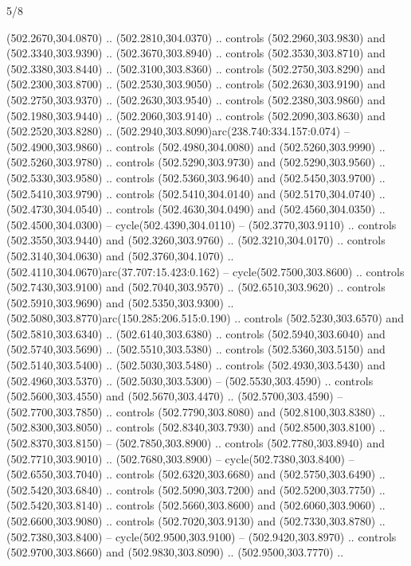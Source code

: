 \begin{flagdescription}{5/8}
\begin{scope}[xshift=0.5\flaglength,yshift=0.5\flagwidth,scale=\flagwidth/475.63]
\begin{scope}[y=0.8pt, x=0.8pt, yscale=-1, xscale=1,shift={(-450,-300)}]
\begin{scope}[cm={{1.0,0.0,0.0,1.0,(-0.0002,0.12556)}},cm={{1.0,0.0,0.0,1.0,(0.00179,0.0)}}]
\begin{scope}[cm={{1.11592,0.0,0.0,1.11592,(-106.89933,-41.77764)}}]
\begin{scope}[draw=black,fill=cfff]
\begin{scope}[fill=black]
  (502.2670,304.0870) .. (502.2810,304.0370) .. controls (502.2960,303.9830) and
  (502.3340,303.9390) .. (502.3670,303.8940) .. controls (502.3530,303.8710) and
  (502.3380,303.8440) .. (502.3100,303.8360) .. controls (502.2750,303.8290) and
  (502.2300,303.8700) .. (502.2530,303.9050) .. controls (502.2630,303.9190) and
  (502.2750,303.9370) .. (502.2630,303.9540) .. controls (502.2380,303.9860) and
  (502.1980,303.9440) .. (502.2060,303.9140) .. controls (502.2090,303.8630) and
  (502.2520,303.8280) .. (502.2940,303.8090)arc(238.740:334.157:0.074) --
  (502.4900,303.9860) .. controls (502.4980,304.0080) and (502.5260,303.9990) ..
  (502.5260,303.9780) .. controls (502.5290,303.9730) and (502.5290,303.9560) ..
  (502.5330,303.9580) .. controls (502.5360,303.9640) and (502.5450,303.9700) ..
  (502.5410,303.9790) .. controls (502.5410,304.0140) and (502.5170,304.0740) ..
  (502.4730,304.0540) .. controls (502.4630,304.0490) and (502.4560,304.0350) ..
  (502.4500,304.0300) -- cycle(502.4390,304.0110) -- (502.3770,303.9110) ..
  controls (502.3550,303.9440) and (502.3260,303.9760) .. (502.3210,304.0170) ..
  controls (502.3140,304.0630) and (502.3760,304.1070) ..
  (502.4110,304.0670)arc(37.707:15.423:0.162) -- cycle(502.7500,303.8600) ..
  controls (502.7430,303.9100) and (502.7040,303.9570) .. (502.6510,303.9620) ..
  controls (502.5910,303.9690) and (502.5350,303.9300) ..
  (502.5080,303.8770)arc(150.285:206.515:0.190) .. controls (502.5230,303.6570)
  and (502.5810,303.6340) .. (502.6140,303.6380) .. controls (502.5940,303.6040)
  and (502.5740,303.5690) .. (502.5510,303.5380) .. controls (502.5360,303.5150)
  and (502.5140,303.5400) .. (502.5030,303.5480) .. controls (502.4930,303.5430)
  and (502.4960,303.5370) .. (502.5030,303.5300) -- (502.5530,303.4590) ..
  controls (502.5600,303.4550) and (502.5670,303.4470) .. (502.5700,303.4590) --
  (502.7700,303.7850) .. controls (502.7790,303.8080) and (502.8100,303.8380) ..
  (502.8300,303.8050) .. controls (502.8340,303.7930) and (502.8500,303.8100) ..
  (502.8370,303.8150) -- (502.7850,303.8900) .. controls (502.7780,303.8940) and
  (502.7710,303.9010) .. (502.7680,303.8900) -- cycle(502.7380,303.8400) --
  (502.6550,303.7040) .. controls (502.6320,303.6680) and (502.5750,303.6490) ..
  (502.5420,303.6840) .. controls (502.5090,303.7200) and (502.5200,303.7750) ..
  (502.5420,303.8140) .. controls (502.5660,303.8600) and (502.6060,303.9060) ..
  (502.6600,303.9080) .. controls (502.7020,303.9130) and (502.7330,303.8780) ..
  (502.7380,303.8400) -- cycle(502.9500,303.9100) -- (502.9420,303.8970) ..
  controls (502.9700,303.8660) and (502.9830,303.8090) .. (502.9500,303.7770) ..

\end{scope}
\end{scope}
\end{scope}
\end{scope}
\end{scope}
\end{scope}
\end{flagdescription}
